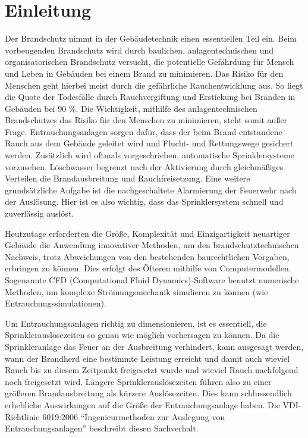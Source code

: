 \chapter{Einleitung}
\label{cha:Einleitung}

Der Brandschutz nimmt in der Gebäudetechnik einen essentiellen Teil ein. Beim vorbeugenden Brandschutz wird durch baulichen, anlagentechnischen und organisatorischen Brandschutz versucht, die potentielle Gefährdung für Mensch und Leben in Gebäuden bei einem Brand zu minimieren. Das Risiko für den Menschen geht hierbei meist durch die gefährliche Rauchentwicklung aus. 
So liegt die Quote der Todesfälle durch Rauchvergiftung und Erstickung bei Bränden in Gebäuden bei 90 \%. Die Wichtigkeit, mithilfe des anlagentechnischen Brandschutzes das Risiko für den Menschen zu minimieren, steht somit außer Frage. Entrauchungsanlagen sorgen dafür, dass der beim Brand entstandene Rauch aus dem Gebäude geleitet wird und Flucht- und Rettungswege gesichert werden. 
Zusätzlich wird oftmals vorgeschrieben, automatische Sprinklersysteme vorzusehen. Löschwasser begrenzt nach der Aktivierung durch gleichmäßiges Verteilen die Brandausbreitung und Rauchfreisetzung. Eine weitere grundsätzliche Aufgabe ist die nachgeschaltete Alarmierung der Feuerwehr nach der Auslösung. Hier ist es also wichtig, dass das Sprinklersystem schnell und zuverlässig auslöst. 

Heutzutage erforderten die Größe, Komplexität und Einzigartigkeit neuartiger Gebäude die Anwendung innovativer Methoden, um den brandschutztechnischen Nachweis, trotz Abweichungen von den bestehenden baurechtlichen Vorgaben, erbringen zu können. 
Dies erfolgt des Öfteren mithilfe von Computermodellen. Sogenannte CFD (Computational Fluid Dynamics)-Software benutzt numerische Methoden, um komplexe Strömungsmechanik simulieren zu können (wie \zB Entrauchungssimulationen). 

Um Entrauchungsanlagen richtig zu dimensionieren, ist es essentiell, die Sprinklerauslösezeiten so genau wie möglich vorhersagen zu können. Da die Sprinkleranlage das Feuer an der Ausbreitung verhindert, kann ausgesagt werden, wann der Brandherd eine bestimmte Leistung erreicht und damit auch wieviel Rauch bis zu diesem Zeitpunkt freigesetzt wurde und wieviel Rauch nachfolgend noch freigesetzt wird. Längere Sprinklerauslösezeiten führen also zu einer größeren Brandausbreitung als kürzere Auslösezeiten. Dies kann schlussendlich erhebliche Auswirkungen auf die Größe der Entrauchungsanlage haben. Die VDI-Richtlinie 6019:2006 "`Ingenieurmethoden zur Auslegung von Entrauchungsanlagen"' beschreibt diesen Sachverhalt.

